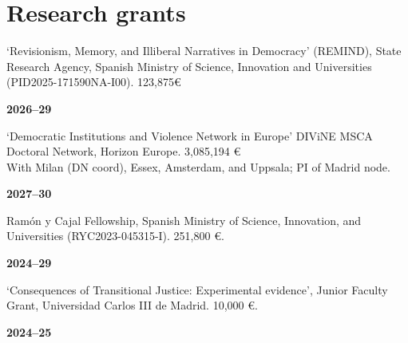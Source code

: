 \documentclass[a4paper, 12pt]{article}
\begin{document}
\section*{Research grants}


\begin{minipage}[t]{0.87\textwidth}
`Revisionism, Memory, and Illiberal Narratives in Democracy' (REMIND), State Research Agency, Spanish Ministry of Science, Innovation and Universities (PID2025-171590NA-I00). 123,875€\\\vspace{-8pt} %
\end{minipage}\hfill\begin{minipage}[t]{0.12\textwidth}
\flushright
\textbf{2026--29}
\end{minipage}\vspace{5pt}
\begin{minipage}[t]{0.87\textwidth}
`Democratic Institutions and Violence Network in Europe' DIViNE MSCA Doctoral Network, Horizon Europe. 3,085,194 €\\With Milan (DN coord), Essex, Amsterdam, and Uppsala; PI of Madrid node.\\\vspace{-8pt}
\end{minipage}\hfill\begin{minipage}[t]{0.12\textwidth} %
\flushright
\textbf{2027--30}
\end{minipage}\vspace{5pt}
\begin{minipage}[t]{0.87\textwidth}
Ramón y Cajal Fellowship, Spanish Ministry of Science, Innovation, and Universities (RYC2023-045315-I). 251,800 €.\\\vspace{-8pt} %
\end{minipage}\hfill\begin{minipage}[t]{0.12\textwidth} 
\flushright
\textbf{2024--29}
\end{minipage}\vspace{5pt}
\begin{minipage}[t]{0.87\textwidth}
`Consequences of Transitional Justice: Experimental evidence', Junior Faculty Grant, Universidad Carlos III de Madrid. 10,000 €.\\\vspace{-8pt} %
\end{minipage}\hfill\begin{minipage}[t]{0.12\textwidth}
\flushright
\textbf{2024--25}
\end{minipage}\vspace{5pt}
\end{document}
